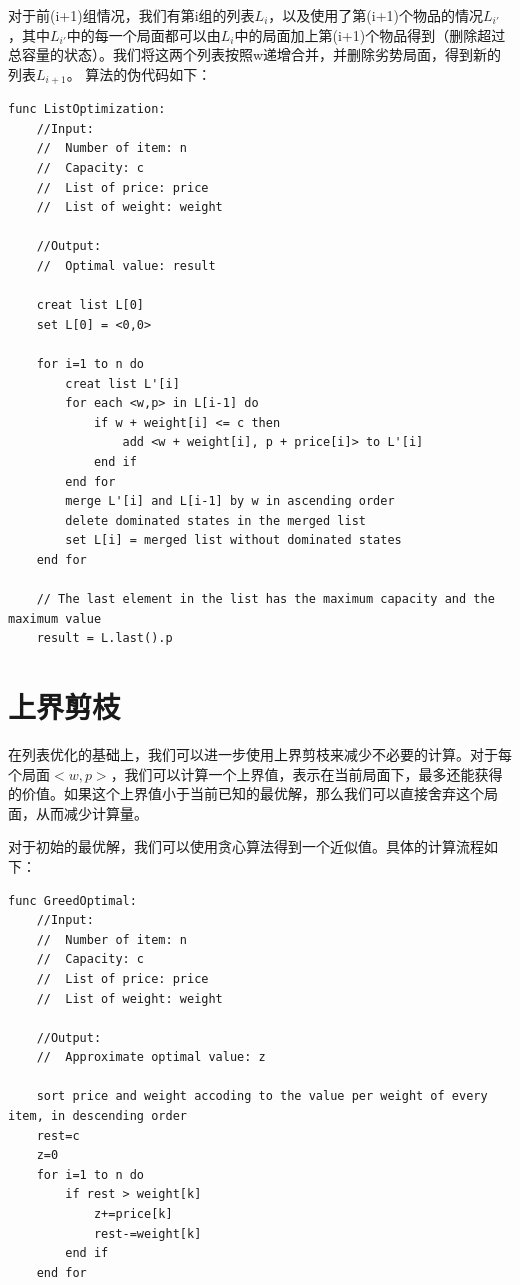\documentclass[openany]{book}
\begin{document}
对于前(i+1)组情况，我们有第i组的列表$L_i$，以及使用了第(i+1)个物品的情况$L_{i'}$，其中$L_{i'}$中的每一个局面都可以由$L_i$中的局面加上第(i+1)个物品得到（删除超过总容量的状态）。我们将这两个列表按照w递增合并，并删除劣势局面，得到新的列表$L_{i+1}$。
算法的伪代码如下：
\begin{lstlisting}
func ListOptimization:
    //Input: 
    //  Number of item: n
    //  Capacity: c
    //  List of price: price
    //  List of weight: weight 

    //Output:
    //  Optimal value: result

    creat list L[0]
    set L[0] = <0,0>

    for i=1 to n do
        creat list L'[i]
        for each <w,p> in L[i-1] do
            if w + weight[i] <= c then
                add <w + weight[i], p + price[i]> to L'[i]
            end if
        end for
        merge L'[i] and L[i-1] by w in ascending order
        delete dominated states in the merged list
        set L[i] = merged list without dominated states
    end for

    // The last element in the list has the maximum capacity and the maximum value
    result = L.last().p  

\end{lstlisting}

\section{上界剪枝}
在列表优化的基础上，我们可以进一步使用上界剪枝来减少不必要的计算。对于每个局面$<w,p>$，我们可以计算一个上界值，表示在当前局面下，最多还能获得的价值。如果这个上界值小于当前已知的最优解，那么我们可以直接舍弃这个局面，从而减少计算量。

对于初始的最优解，我们可以使用贪心算法得到一个近似值。具体的计算流程如下：
\begin{lstlisting}
func GreedOptimal:
    //Input: 
    //  Number of item: n
    //  Capacity: c
    //  List of price: price
    //  List of weight: weight 

    //Output:
    //  Approximate optimal value: z

    sort price and weight accoding to the value per weight of every item, in descending order
    rest=c
    z=0
    for i=1 to n do
        if rest > weight[k]
            z+=price[k]
            rest-=weight[k]
        end if
    end for
\end{lstlisting}
\end{document}
